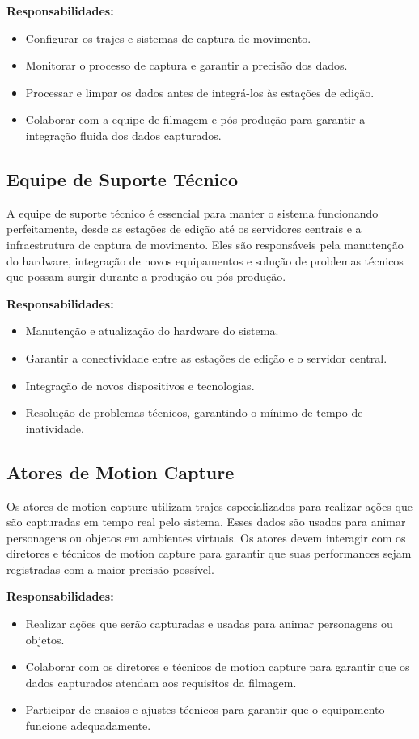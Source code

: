 \textbf{Responsabilidades:}
\begin{itemize}
  \item Configurar os trajes e sistemas de captura de movimento.
  \item Monitorar o processo de captura e garantir a precisão dos dados.
  \item Processar e limpar os dados antes de integrá-los às estações de edição.
  \item Colaborar com a equipe de filmagem e pós-produção para garantir a integração fluida dos dados capturados.
\end{itemize}

\subsection{Equipe de Suporte Técnico}
A equipe de suporte técnico é essencial para manter o sistema funcionando perfeitamente, desde as estações de edição até os servidores centrais e a infraestrutura de captura de movimento. Eles são responsáveis pela manutenção do hardware, integração de novos equipamentos e solução de problemas técnicos que possam surgir durante a produção ou pós-produção.

\textbf{Responsabilidades:}
\begin{itemize}
  \item Manutenção e atualização do hardware do sistema.
  \item Garantir a conectividade entre as estações de edição e o servidor central.
  \item Integração de novos dispositivos e tecnologias.
  \item Resolução de problemas técnicos, garantindo o mínimo de tempo de inatividade.
\end{itemize}

\subsection{Atores de Motion Capture}
Os atores de motion capture utilizam trajes especializados para realizar ações que são capturadas em tempo real pelo sistema. Esses dados são usados para animar personagens ou objetos em ambientes virtuais. Os atores devem interagir com os diretores e técnicos de motion capture para garantir que suas performances sejam registradas com a maior precisão possível.

\textbf{Responsabilidades:}
\begin{itemize}
  \item Realizar ações que serão capturadas e usadas para animar personagens ou objetos.
  \item Colaborar com os diretores e técnicos de motion capture para garantir que os dados capturados atendam aos requisitos da filmagem.
  \item Participar de ensaios e ajustes técnicos para garantir que o equipamento funcione adequadamente.
\end{itemize}

